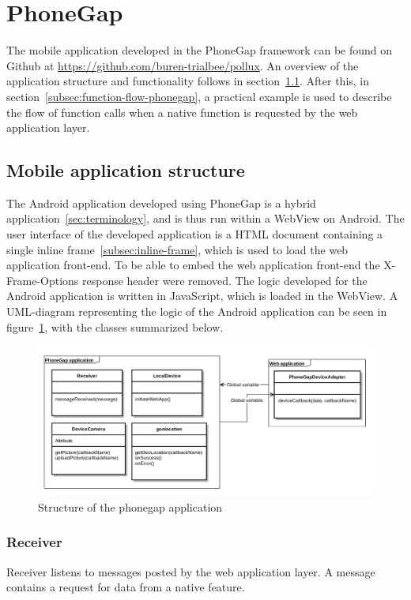 \section{PhoneGap}\label{sec:phonegap}
The mobile application developed in the PhoneGap framework can be found on Github at \url{https://github.com/buren-trialbee/pollux}. An overview of the application structure and functionality follows in section~\ref{subsec:application-structure-phonegap}. After this, in section~\ref{subsec:function-flow-phonegap}, a practical example is used to describe the flow of function calls when a native function is requested by the web application layer.

\subsection{Mobile application structure} \label{subsec:application-structure-phonegap}
The Android application developed using PhoneGap is a hybrid application~\ref{sec:terminology}, and is thus run within a WebView on Android. The user interface of the developed application is a HTML document containing a single inline frame~\ref{subsec:inline-frame}, which is used to load the web application front-end. To be able to embed the web application front-end the X-Frame-Options response header were removed. The logic developed for the Android application is written in JavaScript, which is loaded in the WebView. A UML-diagram representing the logic of the Android application can be seen in figure~\ref{fig:phonegapuml}, with the classes summarized below.
\begin{figure}[h!]
	\centering
    \includegraphics[width=150mm,natwidth=1000,natheight=750]{./img/phonegapuml.png}
    \caption{Structure of the phonegap application}
    \label{fig:phonegapuml}
\end{figure}

\subsubsection{Receiver}
Receiver listens to messages posted by the web application layer. A message contains a request for data from a native feature.
\label{fig:phonegapflow}
